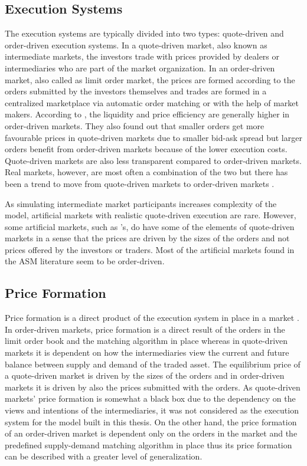 \subsection{Execution Systems}
The execution systems are typically divided into two types:
quote-driven and order-driven execution systems. In a quote-driven market, also known
as intermediate markets, the investors trade with prices provided 
by dealers or intermediaries who are part of the market organization. 
In an order-driven market, also called as limit order market, 
the prices are formed according to the orders submitted by the 
investors themselves and trades are formed in a centralized marketplace 
via automatic order matching or with the help of market makers. 
\citep{Baru17} According to \citet{MALINOVA2013104},
the liquidity and price efficiency are generally higher in order-driven 
markets. They also found out that smaller orders get more favourable prices in 
quote-driven markets due to smaller bid-ask spread 
but larger orders benefit from order-driven markets because of the lower 
execution costs. Quote-driven markets are also less transparent compared
to order-driven markets. Real markets, however, are most often a combination
of the two \citep{boer05} but there has been a trend to move from quote-driven
markets to order-driven markets \citep{MALINOVA2013104}.

As simulating intermediate market participants increases complexity
of the model, artificial markets with realistic quote-driven execution are rare. 
However, some artificial markets, such as \citet{SantaFe99}'s, do have some of 
the elements of quote-driven markets in a sense that the prices are driven by 
the sizes of the orders and not prices offered by the investors or traders. 
Most of the artificial markets found in the ASM literature seem to be order-driven.

\subsection{Price Formation}
Price formation is a direct product of the execution system in place in a market
\citep{boer05}. In order-driven markets, price formation is a direct result of the orders
in the limit order book and the matching algorithm in place whereas in quote-driven markets it
is dependent on how the intermediaries view the current and future 
balance between supply and demand of the traded asset. The equilibrium price of a 
quote-driven market is driven by the sizes of the orders and in order-driven markets
it is driven by also the prices submitted with the orders. \citep{MALINOVA2013104}
As quote-driven markets' price formation is somewhat a black box due to the 
dependency on the views and intentions of the intermediaries, it was not considered
as the execution system for the model built in this thesis. On the other hand, 
the price formation of an order-driven market is dependent only on the orders in the
market and the predefined supply-demand matching algorithm in place thus its price 
formation can be described with a greater level of generalization.

